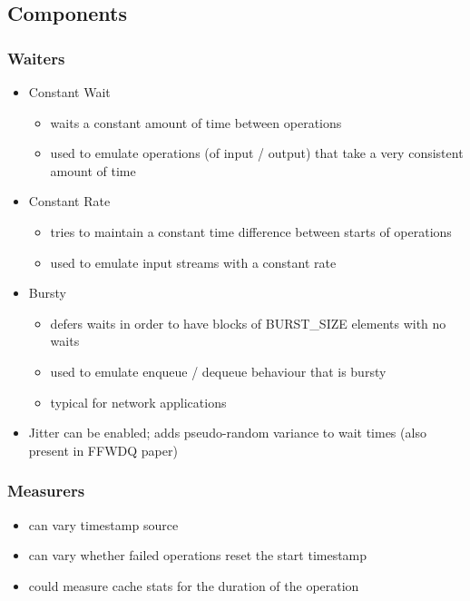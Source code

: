 \subsection{Components}
\subsubsection{Waiters}
\begin{itemize}
    \item Constant Wait
        \begin{itemize}
            \item waits a constant amount of time between operations
            \item used to emulate operations (of input / output) that take a very consistent amount of time
        \end{itemize}
    \item Constant Rate
        \begin{itemize}
            \item tries to maintain a constant time difference between starts of operations
            \item used to emulate input streams with a constant rate
        \end{itemize}
    \item Bursty
        \begin{itemize}
            \item defers waits in order to have blocks of BURST\_SIZE elements with no waits
            \item used to emulate enqueue / dequeue behaviour that is bursty
            \item typical for network applications
        \end{itemize}
    \item Jitter can be enabled; adds pseudo-random variance to wait times (also present in FFWDQ paper)
\end{itemize}

\subsubsection{Measurers}
\begin{itemize}
    \item can vary timestamp source 
    \item can vary whether failed operations reset the start timestamp 
    \item could measure cache stats for the duration of the operation
\end{itemize}
